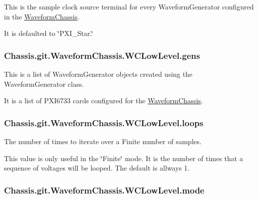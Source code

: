 This is the sample clock source terminal for every Waveform\-Generator configured in the \hyperlink{class_chassis_8git_1_1_waveform_chassis_1_1_waveform_chassis}{Waveform\-Chassis}. 

It is defaulted to \char`\"{}\-P\-X\-I\-\_\-\-Star.\char`\"{} \hypertarget{class_chassis_8git_1_1_waveform_chassis_1_1_w_c_low_level_a424889fed4e03e248c5c9e08a5b6cc4e}{
\subsubsection[{gens}]{\setlength{\rightskip}{0pt plus 5cm}Chassis.\-git.\-Waveform\-Chassis.\-W\-C\-Low\-Level.\-gens}}\label{class_chassis_8git_1_1_waveform_chassis_1_1_w_c_low_level_a424889fed4e03e248c5c9e08a5b6cc4e}


This is a list of Waveform\-Generator objects created using the Waveform\-Generator class. 

It is a list of P\-X\-I6733 cards configured for the \hyperlink{class_chassis_8git_1_1_waveform_chassis_1_1_waveform_chassis}{Waveform\-Chassis}. \hypertarget{class_chassis_8git_1_1_waveform_chassis_1_1_w_c_low_level_a0c7c0fc6eb769656a19f3fd65b179a00}{
\subsubsection[{loops}]{\setlength{\rightskip}{0pt plus 5cm}Chassis.\-git.\-Waveform\-Chassis.\-W\-C\-Low\-Level.\-loops}}\label{class_chassis_8git_1_1_waveform_chassis_1_1_w_c_low_level_a0c7c0fc6eb769656a19f3fd65b179a00}


The number of times to iterate over a Finite number of samples. 

This value is only useful in the \char`\"{}\-Finite\char`\"{} mode. It is the number of times that a sequence of voltages will be looped. The default is allways 1. \hypertarget{class_chassis_8git_1_1_waveform_chassis_1_1_w_c_low_level_aacffb88ec6de041d0b2e59218bfd32e9}{
\subsubsection[{mode}]{\setlength{\rightskip}{0pt plus 5cm}Chassis.\-git.\-Waveform\-Chassis.\-W\-C\-Low\-Level.\-mode}}\label{class_chassis_8git_1_1_waveform_chassis_1_1_w_c_low_level_aacffb88ec6de041d0b2e59218bfd32e9}


